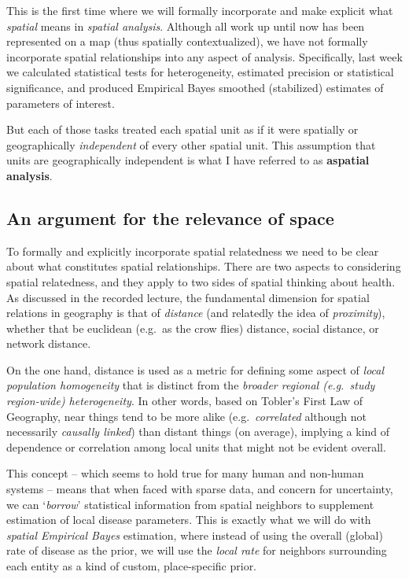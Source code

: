 \documentclass[
]{book}
\begin{document}
This is the first time where we will formally incorporate and make explicit what \emph{spatial} means in \emph{spatial analysis}. Although all work up until now has been represented on a map (thus spatially contextualized), we have not formally incorporate spatial relationships into any aspect of analysis. Specifically, last week we calculated statistical tests for heterogeneity, estimated precision or statistical significance, and produced Empirical Bayes smoothed (stabilized) estimates of parameters of interest.

But each of those tasks treated each spatial unit as if it were spatially or geographically \emph{independent} of every other spatial unit. This assumption that units are geographically independent is what I have referred to as \textbf{aspatial analysis}.

\hypertarget{an-argument-for-the-relevance-of-space}{%
\subsection{An argument for the relevance of space}\label{an-argument-for-the-relevance-of-space}}

To formally and explicitly incorporate spatial relatedness we need to be clear about what constitutes spatial relationships. There are two aspects to considering spatial relatedness, and they apply to two sides of spatial thinking about health. As discussed in the recorded lecture, the fundamental dimension for spatial relations in geography is that of \emph{distance} (and relatedly the idea of \emph{proximity}), whether that be euclidean (e.g.~as the crow flies) distance, social distance, or network distance.

On the one hand, distance is used as a metric for defining some aspect of \emph{local population homogeneity} that is distinct from the \emph{broader regional (e.g.~study region-wide) heterogeneity}. In other words, based on Tobler's First Law of Geography, near things tend to be more alike (e.g.~\emph{correlated} although not necessarily \emph{causally linked}) than distant things (on average), implying a kind of dependence or correlation among local units that might not be evident overall.

This concept -- which seems to hold true for many human and non-human systems -- means that when faced with sparse data, and concern for uncertainty, we can `\emph{borrow}' statistical information from spatial neighbors to supplement estimation of local disease parameters. This is exactly what we will do with \emph{spatial Empirical Bayes} estimation, where instead of using the overall (global) rate of disease as the prior, we will use the \emph{local rate} for neighbors surrounding each entity as a kind of custom, place-specific prior.
\end{document}
